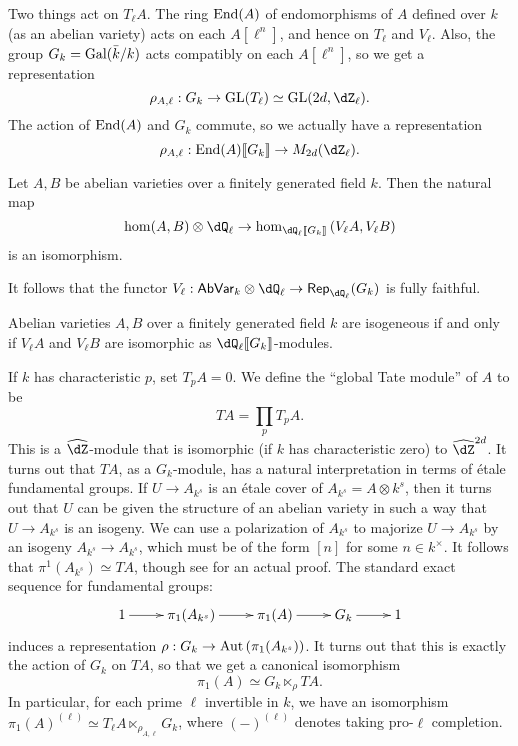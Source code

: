 Two things act on $T_\ell A$. The ring $\operatorname{End}(A)$ of endomorphisms 
of $A$ defined over $k$ (as an abelian variety) acts on each $A[\ell^n]$, and 
hence on $T_\ell$ and $V_\ell$. Also, the group $G_k=\operatorname{Gal}(\bar k/k)$ acts 
compatibly on each $A[\ell^n]$, so we get a representation 
\[
  \rho_{A,\ell}:G_k\to \operatorname{GL}(T_\ell)\simeq \gl{2 d}{\dZ_\ell} \text{.}
\]
The action of $\operatorname{End}(A)$ and $G_k$ commute, so we actually have a 
representation 
\[
  \rho_{A,\ell}:\End(A)\llbracket G_k\rrbracket \to M_{2 d}(\dZ_\ell) \text{.}
\]

\begin{theorem}[Faltings]
Let $A,B$ be abelian varieties over a finitely generated field $k$. Then 
the natural map 
\[
  \hom(A,B)\otimes\dQ_\ell \to \hom_{\dQ_\ell\llbracket G_k\rrbracket}\left(V_\ell A,V_\ell B\right)
\]
is an isomorphism. 
\end{theorem}

It follows that the functor 
$V_\ell:\mathsf{AbVar}_k\otimes\dQ_\ell\to \mathsf{Rep}_{\dQ_\ell}(G_k)$ is 
fully faithful. 

\begin{corollary}
Abelian varieties $A,B$ over a finitely generated field $k$ are isogeneous if 
and only if $V_\ell A$ and $V_\ell B$ are isomorphic as 
$\dQ_\ell\llbracket G_k\rrbracket$-modules.
\end{corollary}

If $k$ has characteristic $p$, set $T_p A=0$. We define the ``global Tate 
module'' of $A$ to be 
\[
  T A = \prod_p T_p A \text{.}
\]
This is a $\widehat\dZ$-module that is isomorphic (if $k$ has characteristic 
zero) to $\widehat\dZ^{2d}$. It turns out that $T A$, as a $G_k$-module, has a 
natural interpretation in terms of \'etale fundamental groups. If 
$U\to A_{k^s}$ is an \'etale cover of $A_{k^s}=A\otimes k^s$, then it turns out 
that $U$ can be given the structure of an abelian variety in such a way that 
$U\to A_{k^s}$ is an isogeny. We can use a polarization of $A_{k^s}$ to 
majorize $U\to A_{k^s}$ by an isogeny $A_{k^s}\to A_{k^s}$, which must be of 
the form $[n]$ for some $n\in k^\times$. It follows that 
$\pi^1(A_{k^s}) \simeq T A$, though see \cite[10.37]{gm13} for an actual 
proof. The standard exact sequence for fundamental groups:
\[\xymatrix{
  1 \ar[r] 
    & \pi_1(A_{k^s}) \ar[r] 
    & \pi_1(A) \ar[r] 
    & G_k \ar[r] 
    & 1
}\]
induces a representation 
$\rho:G_k\to \operatorname{Aut}\left(\pi_1(A_{k^s})\right)$. It turns out that 
this is exactly the action of $G_k$ on $T A$, so that we get a canonical 
isomorphism 
\[
  \pi_1(A) \simeq G_k \ltimes_\rho T A \text{.}
\]
In particular, for each prime $\ell$ invertible in $k$, we have an isomorphism 
$\pi_1(A)^{(\ell)} \simeq T_\ell A\ltimes_{\rho_{A,\ell}} G_k$, where 
$(-)^{(\ell)}$ denotes taking pro-$\ell$ completion. 

